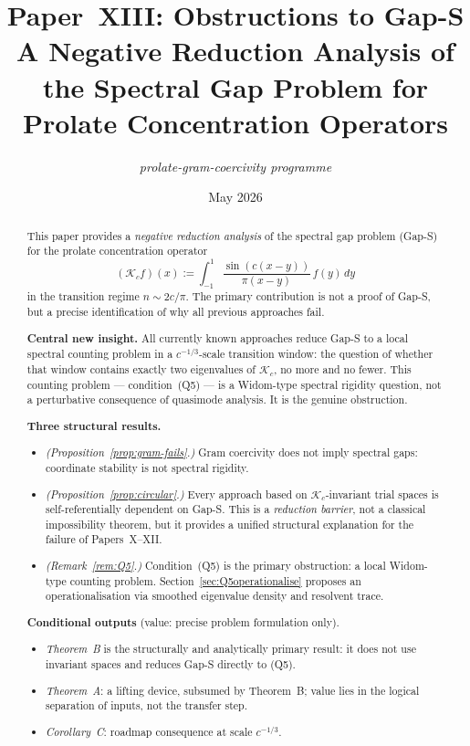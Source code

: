 \documentclass[12pt,a4paper]{amsart}
\theoremstyle{definition}
\theoremstyle{remark}
\newcommand{\Kc}{\mathcal{K}_c}
\begin{document}
\title[Gap-S: Obstruction Analysis]{%
  Paper~XIII: Obstructions to Gap-S\\[0.3em]
  \large A Negative Reduction Analysis of the Spectral Gap Problem
  for Prolate Concentration Operators}

\author{\textit{prolate-gram-coercivity programme}}
\date{May 2026}

\begin{abstract}
This paper provides a \emph{negative reduction analysis} of the spectral
gap problem (Gap-S) for the prolate concentration operator
\[
  (\mathcal{K}_c f)(x) := \int_{-1}^1
  \frac{\sin(c(x-y))}{\pi(x-y)}\,f(y)\,dy
\]
in the transition regime $n \sim 2c/\pi$.
The primary contribution is not a proof of Gap-S,
but a precise identification of why all previous approaches fail.

\medskip\noindent
\textbf{Central new insight.}
All currently known approaches reduce Gap-S to a local spectral
counting problem in a $c^{-1/3}$-scale transition window:
the question of whether that window contains exactly two eigenvalues
of $\Kc$, no more and no fewer.
This counting problem --- condition~(Q5) --- is a Widom-type spectral
rigidity question, not a perturbative consequence of quasimode analysis.
It is the genuine obstruction.

\medskip\noindent
\textbf{Three structural results.}
\begin{itemize}
\item \emph{(Proposition~\ref{prop:gram-fails}.)} Gram coercivity does
  not imply spectral gaps: coordinate stability is not spectral rigidity.
\item \emph{(Proposition~\ref{prop:circular}.)} Every approach based on
  $\Kc$-invariant trial spaces is self-referentially dependent on Gap-S.
  This is a \emph{reduction barrier}, not a classical impossibility theorem,
  but it provides a unified structural explanation for the failure
  of Papers~X--XII.
\item \emph{(Remark~\ref{rem:Q5}.)} Condition~(Q5) is the primary
  obstruction: a local Widom-type counting problem.
  Section~\ref{sec:Q5operationalise} proposes an operationalisation
  via smoothed eigenvalue density and resolvent trace.
\end{itemize}

\medskip\noindent
\textbf{Conditional outputs} (value: precise problem formulation only).
\begin{itemize}
\item \emph{Theorem~B} is the structurally and analytically primary result:
  it does not use invariant spaces and reduces Gap-S directly to (Q5).
\item \emph{Theorem~A}: a lifting device, subsumed by Theorem~B;
  value lies in the logical separation of inputs, not the transfer step.
\item \emph{Corollary~C}: roadmap consequence at scale $c^{-1/3}$.
\end{itemize}
\end{abstract}
\end{document}
